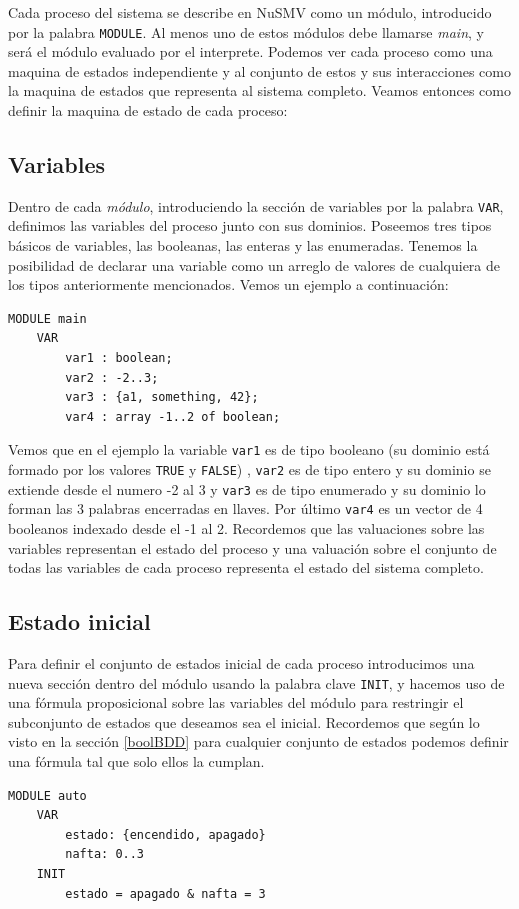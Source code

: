 \documentclass[titlepage, 12pt]{book}
\begin{document}
Cada proceso del sistema se describe en NuSMV como un m\'odulo, introducido por la palabra \texttt{MODULE}. Al menos uno de estos m\'odulos debe llamarse \textit{main}, y ser\'a el m\'odulo evaluado por el interprete. Podemos ver cada proceso como una maquina de estados independiente y al conjunto de estos y sus interacciones como la maquina de estados que representa al sistema completo. Veamos entonces como definir la maquina de estado de cada proceso:\\

\subsection*{Variables}

Dentro de cada \textit{m\'odulo}, introduciendo la secci\'on de variables por la palabra \texttt{VAR}, definimos las variables del proceso junto con sus dominios. Poseemos tres tipos b\'asicos de variables, las booleanas, las enteras y las enumeradas. Tenemos la posibilidad de declarar una variable como un arreglo de valores de cualquiera de los tipos anteriormente mencionados. Vemos un ejemplo a continuaci\'on:
\begin{verbatim}
MODULE main
    VAR
        var1 : boolean;
        var2 : -2..3;
        var3 : {a1, something, 42};
        var4 : array -1..2 of boolean;
\end{verbatim}
Vemos que en el ejemplo la variable \texttt{var1} es de tipo booleano (su dominio est\'a formado por los valores \texttt{TRUE} y \texttt{FALSE}) , \texttt{var2} es de tipo entero y su dominio se extiende desde el numero -2 al 3 y \texttt{var3} es de tipo enumerado y su dominio lo forman las 3 palabras encerradas en llaves. Por \'ultimo \texttt{var4} es un vector de 4 booleanos indexado desde el -1 al 2. Recordemos que las valuaciones sobre las variables representan el estado del proceso y una valuaci\'on sobre el conjunto de todas las variables de cada proceso representa el estado del sistema completo.\\

\subsection*{Estado inicial}

Para definir el conjunto de estados inicial de cada proceso introducimos una nueva secci\'on dentro del m\'odulo usando la palabra clave \texttt{INIT}, y hacemos uso de una f\'ormula proposicional sobre las variables del m\'odulo para restringir el subconjunto de estados que deseamos sea el inicial. Recordemos que seg\'un lo visto en la secci\'on \ref{boolBDD} para cualquier conjunto de estados podemos definir una f\'ormula tal que solo ellos la cumplan.
\begin{verbatim}
MODULE auto
    VAR
        estado: {encendido, apagado}
        nafta: 0..3
    INIT
        estado = apagado & nafta = 3
\end{verbatim}
~\\
\end{document}

